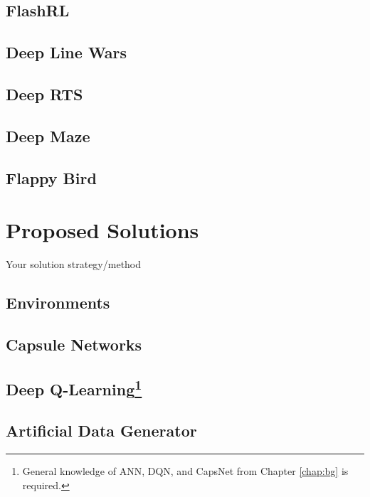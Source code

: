 \documentclass{uia}
\begin{document}
\section{FlashRL}
\label{sec:env:flashrl}

\section{Deep Line Wars}
\label{sec:env:deeplinewars}

\section{Deep RTS}
\label{sec:env:deeprts}

\section{Deep Maze}
\label{sec:env:maze}

\section{Flappy Bird}
\label{sec:env:flappybird}


\chapter{Proposed Solutions}
\label{chap:solutions}

Your solution strategy/method

\section{Environments}
\label{sec:solutions:environments}

\section{Capsule Networks}
\label{sec:solutions:capsnet}

\section[Deep Q-Learning]{Deep Q-Learning\footnote{General knowledge of ANN, DQN, and CapsNet from Chapter \ref{chap:bg} is required.}}
\label{sec:solutions:dqn}

\section{Artificial Data Generator}
\label{sec:solutions:datagen}
\end{document}
